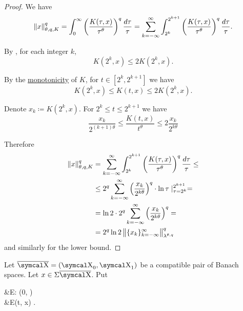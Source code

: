 \begin{proof}
  We have
  \begin{equation*}
    \left\Vert x \right\Vert_{\theta,q,K}^q
    =
    \int_0^\infty \left( \frac {K(\tau, x)} {\tau^\theta} \right)^q \frac {d\tau} \tau
    =
    \sum_{k=-\infty}^\infty \int_{2^k}^{2^{k+1}} \left( \frac {K(\tau, x)} {\tau^\theta} \right)^q \frac {d\tau} \tau.
  \end{equation*}

  By , for each integer \( k \),
  \begin{equation*}
    K(2^k, x) \leq 2 K(2^k, x).
  \end{equation*}

  By the \hyperref[def:k_functional_properties/basic]{monotonicity} of \( K \), for \( t \in [2^k, 2^{k+1}] \) we have
  \begin{equation*}
    K(2^k, x) \leq K(t, x) \leq 2 K(2^k, x).
  \end{equation*}

  Denote \( x_k \coloneqq K(2^k, x) \). For \( 2^k \leq t \leq 2^{k+1} \) we have
  \begin{equation*}
    \frac{x_k}{2^{(k+1)\theta}} \leq \frac{K(t, x)}{t^\theta} \leq 2 \frac{x_k}{2^{k\theta}}
  \end{equation*}

  Therefore
  \begin{align*}
    \left\Vert x \right\Vert_{\theta,q,K}^q
    &=
    \sum_{k=-\infty}^\infty \int_{2^k}^{2^{k+1}} \left( \frac {K(\tau, x)} {\tau^\theta} \right)^q \frac {d\tau} \tau
    \leq \\ &\leq
    2^q \sum_{k=-\infty}^\infty \left(\frac{x_k}{2^{k\theta}} \right)^q \cdot \ln \tau \mid_{\tau=2^k}^{2^{k+1}}
    = \\ &=
    \ln 2 \cdot 2^q \sum_{k=-\infty}^\infty \left(\frac{x_k}{2^{k\theta}} \right)^q
    = \\ &=
    2^q \ln 2 \left\Vert \{ x_k \}_{k=-\infty}^\infty \right\Vert_{\lambda^{\theta,q}}^q
  \end{align*}
  and similarly for the lower bound.
\end{proof}

\begin{definition}\label{def:e_functional}
  Let \( \Ol{\CX} = (\CX_0, \CX_1) \) be a compatible pair of Banach spaces. Let \( x \in \Sigma \Ol{\CX} \). Put
  \begin{AlignedEquation}\label{eq:def:e_functional}
    &E: (0, \infty) \times {\Sigma \Ol{\CX}} \\
    &E(t, x) \coloneqq \inf {}.
  \end{AlignedEquation}
\end{definition}

